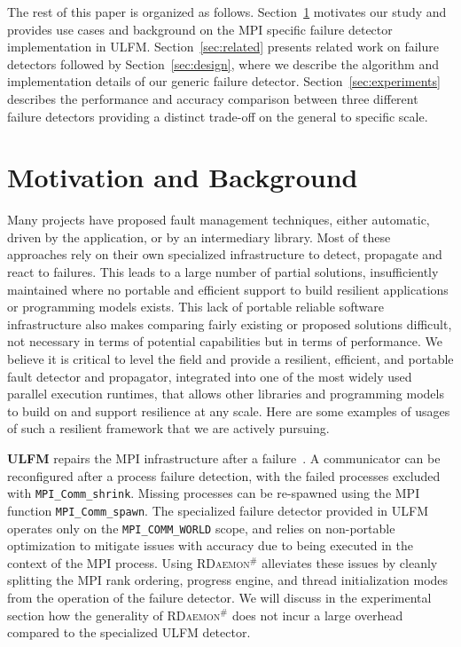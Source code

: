 \documentclass[5p,times,twocolumn]{elsarticle}
\newcommand{\mpifunc}[1]{\lstinline"MPI_#1"\xspace}
\newcommand{\ulfm}[0]{\textsc{ULFM}\xspace}
\newcommand{\mpi}[0]{\textsc{MPI}\xspace}
\newcommand{\ourwork}[0]{\textsc{RDaemon}\ensuremath{^\#}\xspace}
\begin{document}
The rest of this paper is organized as follows. Section~\ref{sec:motivation}
motivates our study and provides use cases and background on the \mpi specific
failure detector implementation in \ulfm. Section~\ref{sec:related} presents
related work on failure detectors followed by Section~\ref{sec:design}, where we
describe the algorithm and implementation details of our generic failure
detector. Section~\ref{sec:experiments} describes the performance and accuracy
comparison between three different failure detectors providing a distinct
trade-off on the general to specific scale.

\section{Motivation and Background}\label{sec:motivation}

Many projects have proposed fault management techniques, either automatic,
 driven by the application, or by an intermediary library. Most of these approaches
rely on their own specialized infrastructure to detect, propagate and react to failures.
This leads to a large number of partial solutions, insufficiently maintained where no portable
and efficient support to build resilient applications or programming models exists.
This lack of portable reliable software infrastructure also makes comparing fairly
existing or proposed solutions difficult, not necessary in terms of potential capabilities
but in terms of performance. We believe it is critical to level the field and provide a resilient, efficient, and portable fault detector and propagator, integrated into one of the most widely used parallel execution runtimes, that allows other libraries and programming models to build on and support resilience at any scale. Here are some examples of usages of such a resilient framework that we are actively pursuing.

\textbf{\ulfm} repairs the \mpi infrastructure after a failure~\cite{Bland2013}. A communicator can be reconfigured after a
process failure detection, with the failed processes excluded with \mpifunc{Comm_shrink}. Missing processes
can be re-spawned using the \mpi function \mpifunc{Comm_spawn}. The specialized failure detector provided
in \ulfm operates only on the \mpifunc{COMM_WORLD} scope, and relies on non-portable optimization
to mitigate issues with accuracy due to being executed in the context of the \mpi process.
Using \ourwork alleviates these issues by cleanly splitting the \mpi rank ordering,
progress engine, and thread initialization modes from the operation of the failure
detector. We will discuss in the experimental section how the generality of
\ourwork does not incur a large overhead compared to the specialized \ulfm detector.
\end{document}

